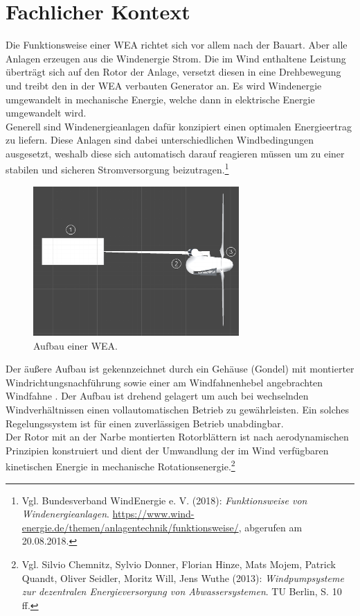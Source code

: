 \newpage

\section{Fachlicher Kontext}
\label{sec:FachlicherKontext}
Die Funktionsweise einer WEA richtet sich vor allem nach der Bauart. Aber alle Anlagen erzeugen aus die Windenergie Strom. Die im Wind enthaltene Leistung überträgt sich auf den Rotor der Anlage, versetzt diesen in eine Drehbewegung und treibt den in der WEA verbauten Generator an. Es wird Windenergie umgewandelt in mechanische Energie, welche dann in elektrische Energie umgewandelt wird. \\
Generell sind Windenergieanlagen dafür konzipiert einen optimalen Energieertrag zu liefern. Diese Anlagen sind dabei unterschiedlichen Windbedingungen ausgesetzt, weshalb diese sich automatisch darauf reagieren müssen um zu einer stabilen und sicheren Stromversorgung beizutragen.\footnote{Vgl. Bundesverband WindEnergie e. V.  (2018): \textit{Funktionsweise von Windenergieanlagen}.\newline
\url{https://www.wind-energie.de/themen/anlagentechnik/funktionsweise/},\newline 
abgerufen am 20.08.2018.}  





\begin{figure}[H]
	\centering
	\captionsetup{width=0.7\textwidth}
	\includegraphics[keepaspectratio, width=0.7\textwidth]{bildquellen/WEA1_1}
	\caption{Aufbau einer WEA.}
	\label{fig:1}
\end{figure}

Der äußere Aufbau ist gekennzeichnet durch ein Gehäuse (Gondel) mit montierter Windrichtungsnachführung  sowie einer am Windfahnenhebel angebrachten Windfahne . Der Aufbau ist drehend gelagert um auch bei wechselnden Windverhältnissen einen vollautomatischen Betrieb zu gewährleisten. Ein solches Regelungssystem ist für einen zuverlässigen Betrieb unabdingbar. \\
Der Rotor mit an der Narbe montierten Rotorblättern  ist nach aerodynamischen Prinzipien konstruiert und dient der Umwandlung der im Wind verfügbaren kinetischen Energie in mechanische Rotationsenergie.\footnote{Vgl. Silvio Chemnitz, Sylvio Donner, Florian Hinze, Mats Mojem, Patrick Quandt, Oliver Seidler, Moritz Will, Jens Wuthe (2013): \textit{Windpumpsysteme zur dezentralen Energieversorgung von Abwassersystemen}. TU Berlin, S. 10 ff.}

